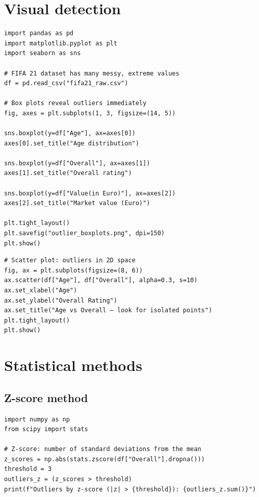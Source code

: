 \section{Visual detection}

\begin{verbatim}
import pandas as pd
import matplotlib.pyplot as plt
import seaborn as sns

# FIFA 21 dataset has many messy, extreme values
df = pd.read_csv("fifa21_raw.csv")

# Box plots reveal outliers immediately
fig, axes = plt.subplots(1, 3, figsize=(14, 5))

sns.boxplot(y=df["Age"], ax=axes[0])
axes[0].set_title("Age distribution")

sns.boxplot(y=df["Overall"], ax=axes[1])
axes[1].set_title("Overall rating")

sns.boxplot(y=df["Value(in Euro)"], ax=axes[2])
axes[2].set_title("Market value (Euro)")

plt.tight_layout()
plt.savefig("outlier_boxplots.png", dpi=150)
plt.show()
\end{verbatim}

\begin{verbatim}
# Scatter plot: outliers in 2D space
fig, ax = plt.subplots(figsize=(8, 6))
ax.scatter(df["Age"], df["Overall"], alpha=0.3, s=10)
ax.set_xlabel("Age")
ax.set_ylabel("Overall Rating")
ax.set_title("Age vs Overall — look for isolated points")
plt.tight_layout()
plt.show()
\end{verbatim}

\section{Statistical methods}

\subsection{Z-score method}

\begin{verbatim}
import numpy as np
from scipy import stats

# Z-score: number of standard deviations from the mean
z_scores = np.abs(stats.zscore(df["Overall"].dropna()))
threshold = 3
outliers_z = (z_scores > threshold)
print(f"Outliers by z-score (|z| > {threshold}): {outliers_z.sum()}")
\end{verbatim}


